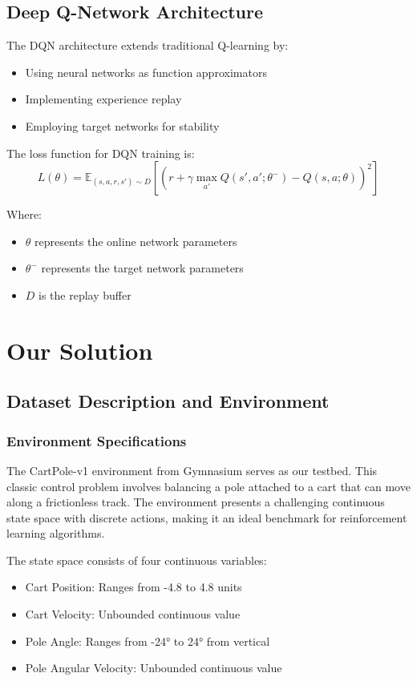 \documentclass[conference]{IEEEtran}
\begin{document}
\subsection{Deep Q-Network Architecture}
The DQN architecture extends traditional Q-learning by:
\begin{itemize}
    \item Using neural networks as function approximators
    \item Implementing experience replay
    \item Employing target networks for stability
\end{itemize}

The loss function for DQN training is:
\begin{equation}
    L(\theta) = \mathbb{E}_{(s,a,r,s')\sim D}\left[(r + \gamma \max_{a'} Q(s',a';\theta^-) - Q(s,a;\theta))^2\right]
\end{equation}

Where:
\begin{itemize}
    \item $\theta$ represents the online network parameters
    \item $\theta^-$ represents the target network parameters
    \item $D$ is the replay buffer
\end{itemize}

\section{Our Solution}
\subsection{Dataset Description and Environment}
\subsubsection{Environment Specifications}
The CartPole-v1 environment from Gymnasium serves as our testbed. This classic control problem involves balancing a pole attached to a cart that can move along a frictionless track. The environment presents a challenging continuous state space with discrete actions, making it an ideal benchmark for reinforcement learning algorithms.

The state space consists of four continuous variables:
\begin{itemize}
    \item Cart Position: Ranges from -4.8 to 4.8 units
    \item Cart Velocity: Unbounded continuous value
    \item Pole Angle: Ranges from -24° to 24° from vertical
    \item Pole Angular Velocity: Unbounded continuous value
\end{itemize}
\end{document}
